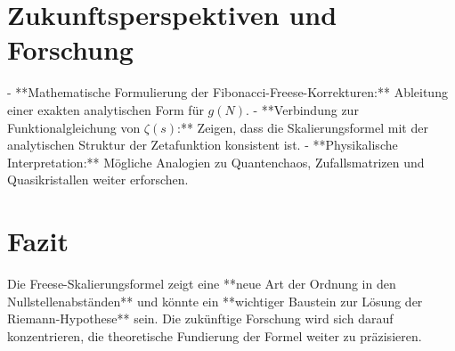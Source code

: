 \documentclass[a4paper,12pt]{article}
\begin{document}
\section{Zukunftsperspektiven und Forschung}
- **Mathematische Formulierung der Fibonacci-Freese-Korrekturen:** Ableitung einer exakten analytischen Form für $g(N)$.
- **Verbindung zur Funktionalgleichung von $\zeta(s)$:** Zeigen, dass die Skalierungsformel mit der analytischen Struktur der Zetafunktion konsistent ist.
- **Physikalische Interpretation:** Mögliche Analogien zu Quantenchaos, Zufallsmatrizen und Quasikristallen weiter erforschen.

\section{Fazit}
Die Freese-Skalierungsformel zeigt eine **neue Art der Ordnung in den Nullstellenabständen** und könnte ein **wichtiger Baustein zur Lösung der Riemann-Hypothese** sein. Die zukünftige Forschung wird sich darauf konzentrieren, die theoretische Fundierung der Formel weiter zu präzisieren.



\end{document}
